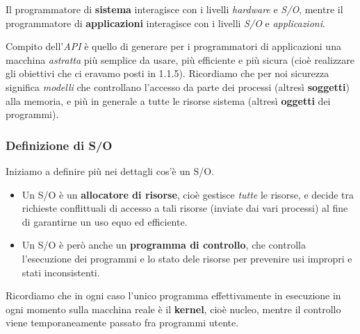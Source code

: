 \documentclass[a4paper,11pt]{article}
\begin{document}
Il programmatore di \textbf{sistema} interagisce con i livelli \textit{hardware} e \textit{S/O}, mentre il programmatore di \textbf{applicazioni} interagisce con i livelli \textit{S/O} e \textit{applicazioni}. 

Compito dell'\textit{API} è quello di generare per i programmatori di applicazioni una macchina \textit{astratta} più semplice da usare, più efficiente e più sicura (cioè realizzare gli obiettivi che ci eravamo posti in 1.1.5).
Ricordiamo che per noi sicurezza significa \textit{modelli} che controllano l'accesso da parte dei processi (altresì \textbf{soggetti}) alla memoria, e più in generale a tutte le risorse sistema (altresì \textbf{oggetti} dei programmi).

\subsubsection{Definizione di S/O}
Iniziamo a definire più nei dettagli cos'è un S/O.
\begin{itemize}
	\item Un S/O è un \textbf{allocatore di risorse}, cioè gestisce \textit{tutte} le risorse, e decide tra richieste conflittuali di accesso a tali risorse (inviate dai vari processi) al fine di garantirne un uso equo ed efficiente.
	\item Un S/O è però anche un \textbf{programma di controllo}, che controlla l'esecuzione dei programmi e lo stato dele risorse per prevenire usi impropri e stati inconsistenti.
\end{itemize}

Ricordiamo che in ogni caso l'unico programma effettivamente in esecuzione in ogni momento sulla macchina reale è il \textbf{kernel}, cioè nucleo, mentre il controllo viene temporaneamente passato fra programmi utente.
\end{document}
